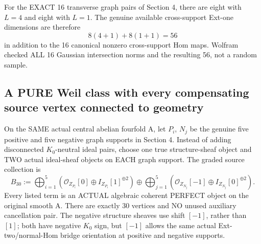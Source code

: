 \documentclass[11pt,a4paper]{article}
\begin{document}
For the EXACT 16
transverse graph pairs
of Section 4, there are
eight with \(L=4\)
and eight with \(L=1\).
The genuine available
cross-support Ext-one
dimensions are therefore
\[
 \boxed{
   8(4+1)+8(1+1)=56
 }                                                       \tag{9.4}
\]
in addition to the 16
canonical nonzero
cross-support Hom maps.
Wolfram checked ALL
16 Gaussian intersection
norms and the resulting
56, not a random sample.

\subsection*{A PURE Weil class with every compensating source vertex connected to geometry}
On the SAME actual
central abelian fourfold A,
let \(P_i\), \(N_j\)
be the genuine five
positive and five
negative graph supports
in Section 4.
Instead of adding
disconnected \(K_0\)-neutral
ideal pairs, choose one
true structure-sheaf
object and TWO actual
ideal-sheaf objects
on EACH graph support.
The graded source
collection is
\[
 \boxed{
 B_{30}:=
  \bigoplus_{i=1}^{5}
   \left(
      \mathcal O_{Z_{P_i}}[0]
      \oplus I_{Z_{P_i}}[1]^{\oplus2}\right)
 \oplus
 \bigoplus_{j=1}^{5}
   \left(
      \mathcal O_{Z_{N_j}}[-1]
      \oplus I_{Z_{N_j}}[0]^{\oplus2}\right).
 }                                                       \tag{9.5}
\]
Every listed term is an
ACTUAL algebraic coherent
PERFECT object on
the original smooth A.
There are exactly 30
vertices and NO unused
auxiliary cancellation
pair. The negative
structure sheaves use
shift \([-1]\), rather
than \([1]\); both have
negative \(K_0\) sign,
but \([-1]\) allows
the same actual
Ext-two/normal-Hom
bridge orientation
at positive and
negative supports.
\end{document}
